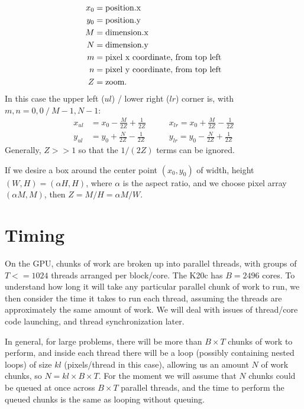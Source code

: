 \documentclass[10pt]{article} %
\begin{document}
\begin{align*}
x_0 &= \hbox{\rm position.x}\\
y_0 &= \hbox{\rm position.y}\\
M &= \hbox{\rm dimension.x}\\
N &= \hbox{\rm dimension.y}\\
m &= \hbox{\rm pixel x coordinate, from top left}\\
n &= \hbox{\rm pixel y coordinate, from top left}\\
Z &= \hbox{\rm zoom.}
\end{align*}
In this case the upper left ($ul$) / lower right ($lr$) corner is, with $m,n=0,0\ /\ M-1, N-1$:
\begin{align}
x_{ul} &= x_0 - \frac{M}{2Z} + \frac{1}{2Z} \qquad &x_{lr} = x_0 + \frac{M}{2Z} - \frac{1}{2Z} \\
y_{ul} &= y_0 + \frac{N}{2Z} - \frac{1}{2Z} \qquad &y_{lr} = y_0 - \frac{N}{2Z} + \frac{1}{2Z}
\end{align}
Generally, $Z>>1$ so that the $1/(2Z)$ terms can be ignored.

If we desire a box around the center point $(x_0,y_0)$ of width, height $(W,H) = (\alpha H, H)$, where $\alpha$ is the aspect ratio, and we choose pixel array $(\alpha M, M)$, then $Z= M / H = \alpha M / W$. 
\section{Timing}
On the GPU, chunks of work are broken up into parallel threads, with groups of $T<=1024$ threads arranged per block/core. The K20c has $B=2496$ cores. To understand how long it will take any particular parallel chunk of work to run, we then consider the time it takes to run each thread, assuming the threads are approximately the same amount of work. We will deal with issues of thread/core code launching,  and thread synchronization later. 

In general, for large problems, there will be more than $B\times T$ chunks of work to perform, and inside each thread there will be a loop (possibly containing nested loops) of size $kl$ (pixels/thread in this case), allowing us an amount $N$ of work chunks, so $N = kl\times B \times T$. For the moment we will assume that $N$ chunks could be queued at once across $B\times T$ parallel threads, and the time to perform the queued chunks is the same as looping without queuing. 
\end{document}
